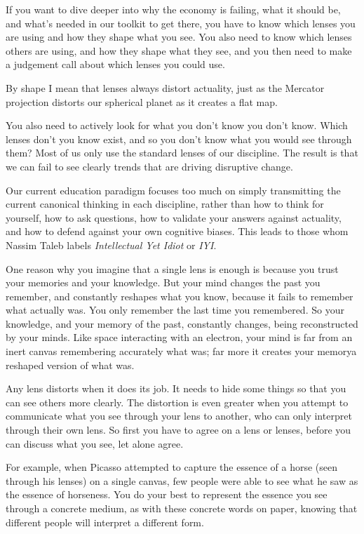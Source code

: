 If you want to dive deeper into why the economy is failing, what it should be, and what’s needed in our toolkit to get there, you have to know which lenses you are using and how they shape what you see. You also need to know which lenses others are using, and how they shape what they see, and you then need to make a judgement call about which lenses you could use. 


By shape I mean that lenses always distort actuality, just as the Mercator projection distorts our spherical planet as it creates a flat map. 


You also need to actively look for what you don’t know you don't know. Which lenses don’t you know exist, and so you don't know what you would see through them? Most of us only use the standard lenses of our discipline. The result is that we can fail to see clearly trends that are driving disruptive change. 


Our current education paradigm focuses too much on simply transmitting the current canonical thinking in each discipline, rather than how to think for yourself, how to ask questions, how to validate your answers against actuality, and how to defend against your own cognitive biases. This leads to those whom Nassim Taleb\cite{taleb-skin} labels \emph{Intellectual Yet Idiot} or \emph{IYI}. 


One reason why you imagine that a single lens is enough is because you trust your memories and your knowledge. But your mind changes the past you remember, and constantly reshapes what you know, because it fails to remember what actually was\cite{loftus-false-memory-wiki, loftus-false-memory-ted}. You only remember the last time you remembered. So your knowledge, and your memory of the past, constantly changes, being reconstructed by your minds. Like space interacting with an electron, your mind is far from an inert canvas remembering accurately what was; far more it creates your memory\textemdash a reshaped version of what was.


Any lens distorts when it does its job. It needs to hide some things so that you can see others more clearly. The distortion is even greater when you attempt to communicate what you see through your lens to another, who can only interpret through their own lens. So first you have to agree on a lens or lenses, before you can discuss what you see, let alone agree. 


For example, when Picasso attempted to capture the essence of a horse (seen through his lenses) on a single canvas, few people were able to see what he saw as the essence of horseness. You do your best to represent the essence you see through a concrete medium, as with these concrete words on paper, knowing that different people will interpret a different form. 


